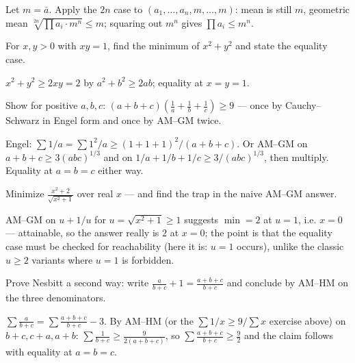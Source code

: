 \begin{solution}
Let $m=\bar a$. Apply the $2n$ case to
$(a_1,\dots,a_n,m,\dots,m)$: mean is still $m$, geometric mean
$\sqrt[2n]{\prod a_i \cdot m^n}\le m$; squaring out $m^n$ gives
$\prod a_i \le m^n$.
\end{solution}
\begin{exercise}[easy]\label{exr:a12}
For $x,y>0$ with $xy=1$, find the minimum of $x^2+y^2$ and state the
equality case.
\end{exercise}
\begin{solution}
$x^2+y^2 \ge 2xy = 2$ by $a^2+b^2\ge2ab$; equality at $x=y=1$.
\end{solution}
\begin{exercise}[medium]\label{exr:a13}
Show for positive $a,b,c$: $(a+b+c)\left(\frac1a+\frac1b+\frac1c\right)
\ge 9$ --- once by Cauchy--Schwarz in Engel form and once by AM--GM
twice.
\end{exercise}
\begin{solution}
Engel: $\sum 1/a = \sum 1^2/a \ge (1+1+1)^2/(a+b+c)$. Or AM--GM on
$a+b+c \ge 3(abc)^{1/3}$ and on $1/a+1/b+1/c \ge 3/(abc)^{1/3}$, then
multiply. Equality at $a=b=c$ either way.
\end{solution}
\begin{exercise}[medium]\label{exr:a14}
Minimize $\frac{x^2+2}{\sqrt{x^2+1}}$ over real $x$ --- and find the
trap in the naive AM--GM answer.
\end{exercise}
\begin{solution}
AM--GM on $u+1/u$ for $u=\sqrt{x^2+1}\ge1$ suggests $\min=2$ at
$u=1$, i.e. $x=0$ --- attainable, so the answer really is $2$ at
$x=0$; the point is that the equality case must be checked for
reachability (here it is: $u=1$ occurs), unlike the classic
$u \ge 2$ variants where $u=1$ is forbidden.
\end{solution}
\begin{exercise}[hard]\label{exr:a15}
Prove Nesbitt a second way: write $\frac{a}{b+c}+1 =
\frac{a+b+c}{b+c}$ and conclude by AM--HM on the three denominators.
\end{exercise}
\begin{solution}
$\sum \frac{a}{b+c} = \sum\frac{a+b+c}{b+c} - 3$. By
AM--HM (or the $\sum 1/x \ge 9/\sum x$ exercise above) on
$b+c, c+a, a+b$: $\sum \frac{1}{b+c} \ge
\frac{9}{2(a+b+c)}$, so $\sum\frac{a+b+c}{b+c} \ge \frac{9}{2}$ and the
claim follows with equality at $a=b=c$.
\end{solution}

